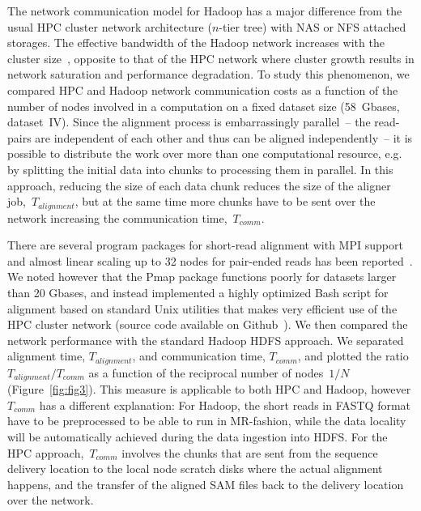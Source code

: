 \documentclass[10pt]{article}
\begin{document}
The network communication model for Hadoop has a major difference from the usual HPC cluster network architecture ($n$-tier tree) with NAS or NFS attached storages. The effective bandwidth of the Hadoop network increases with the cluster size~\cite{Sammer:2012}, opposite to that of the HPC network where cluster growth results in network saturation and performance degradation.
To study this phenomenon, we compared HPC and Hadoop network communication costs
as a function of the number of nodes involved in a computation on a fixed dataset size (58~Gbases, dataset~IV).
 Since the alignment process is embarrassingly parallel~-- the read-pairs are
independent of each other and thus can be aligned independently~-- it is
possible to distribute the work over more than one computational resource, e.g. by
splitting the initial data into chunks to processing them in parallel. In this
approach, reducing the size of each data chunk reduces the size of the aligner
job,~$T_{alignment}$, but at the same time more chunks have to be sent over the network increasing the communication time,~$T_{comm}$.

There are several program packages for short-read alignment with MPI support~\cite{pmap, gnumap} and almost linear scaling up to 32 nodes for pair-ended reads has been reported~\cite{Bozdag:2010cn}.
We noted however that the Pmap package functions poorly for datasets larger than 20 Gbases, and instead implemented a highly optimized Bash script for alignment based on standard Unix utilities that makes very efficient use of the HPC
cluster network (source code available on Github~\cite{code_repo_bash}). We then compared the network
performance with the standard Hadoop HDFS approach. We separated alignment
time, $T_{alignment}$, and communication time, $T_{comm}$, and plotted
the ratio $T_{alignment}/T_{comm}$ as a function of the reciprocal number of nodes~$1/N$
(Figure~\ref{fig:fig3}).  This measure is applicable to both HPC and Hadoop,
however $T_{comm}$ has a different explanation: For Hadoop, the short reads in
FASTQ format have to be preprocessed
to be able to run in MR-fashion, while the data locality will be automatically
achieved during the data ingestion into HDFS. For the HPC approach,~$T_{comm}$ involves the chunks that are
sent from the sequence delivery location to the local node scratch disks where
the actual alignment happens, and the transfer of the aligned SAM files back to
the delivery location over the network.

\end{document}
